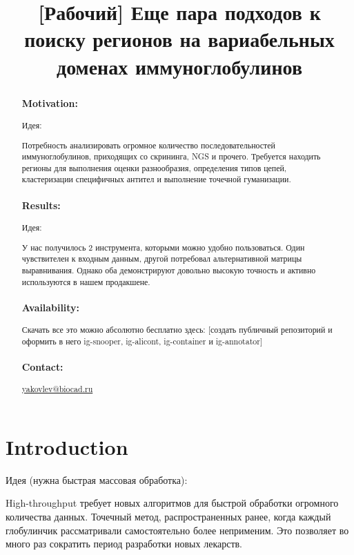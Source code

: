 \documentclass[a4paper,12pt]{article}
\title{[Рабочий] Еще пара подходов к поиску регионов на вариабельных
  доменах иммуноглобулинов}
\begin{document}
  \maketitle

  \begin{abstract}
    \subsubsection*{Motivation:}
      Идея:

      Потребность анализировать огромное количество
      последовательностей иммуноглобулинов, приходящих со скрининга,
      NGS и прочего. Требуется находить регионы для выполнения оценки
      разнообразия, определения типов цепей, кластеризации специфичных
      антител и выполнение точечной гуманизации.

    \subsubsection*{Results:}
      Идея:

      У нас получилось 2 инструмента, которыми можно удобно
      пользоваться. Один чувствителен к входным данным, другой
      потребовал альтернативной матрицы выравнивания. Однако оба
      демонстрируют довольно высокую точность и активно используются в
      нашем продакшене.

    \subsubsection*{Availability:}
      Скачать все это можно абсолютно бесплатно здесь: [создать публичный
      репозиторий и оформить в него ig-snooper, ig-alicont,
      ig-container и ig-annotator]
    \subsubsection*{Contact:}
      \href{yakovlev@biocad.ru}{yakovlev@biocad.ru}
  \end{abstract}

  \section{Introduction}

  Идея (нужна быстрая массовая обработка):

  High-throughput требует новых алгоритмов для быстрой обработки
  огромного количества данных. Точечный метод, распространенных ранее,
  когда каждый глобулинчик рассматривали самостоятельно более
  неприменим. Это позволяет во много раз сократить период разработки
  новых лекарств.
\end{document}
